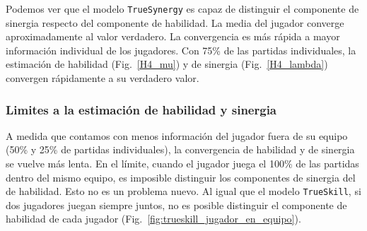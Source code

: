 \documentclass[a4paper,11pt]{book}
\theoremstyle{definition}
\begin{document}
Podemos ver que el modelo \texttt{TrueSynergy} es capaz de distinguir el componente de sinergia respecto del componente de habilidad.
La media del jugador converge aproximadamente al valor verdadero.
La convergencia es m\'as r\'apida a mayor informaci\'on individual de los jugadores.
Con 75\% de las partidas individuales, la estimaci\'on de habilidad (Fig.~\ref{H4_mu}) y de sinergia (Fig.~\ref{H4_lambda}) convergen r\'apidamente a su verdadero valor.

\subsubsection{Limites a la estimaci\'on de habilidad y sinergia}

A medida que contamos con menos informaci\'on del jugador fuera de su equipo (50\% y 25\% de partidas individuales), la convergencia de habilidad y de sinergia se vuelve m\'as lenta.
En el l\'imite, cuando el jugador juega el 100\% de las partidas dentro del mismo equipo, es imposible distinguir los componentes de sinergia del de habilidad.
Esto no es un problema nuevo.
Al igual que el modelo \texttt{TrueSkill}, si dos jugadores juegan siempre juntos, no es posible distinguir el componente de habilidad de cada jugador (Fig.~\ref{fig:trueskill_jugador_en_equipo}).
\end{document}
